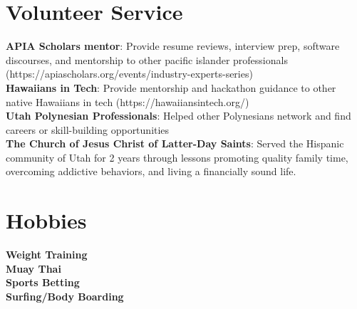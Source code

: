 \documentclass[letterpaper,11pt]{article}
\begin{document}
\section{Volunteer Service}
 \begin{itemize}[leftmargin=0.15in, label={}]
    \small{\item{
     \textbf{APIA Scholars mentor}{: Provide resume reviews, interview prep, software discourses, and mentorship to other pacific islander professionals (https://apiascholars.org/events/industry-experts-series)} \\
     \textbf{Hawaiians in Tech}{: Provide mentorship and hackathon guidance to other native Hawaiians in tech (https://hawaiiansintech.org/)} \\
     \textbf{Utah Polynesian Professionals}{: Helped other Polynesians network and find careers or skill-building opportunities} \\
     \textbf{The Church of Jesus Christ of Latter-Day Saints}{: Served the Hispanic community of Utah for 2 years through lessons promoting quality family time, overcoming addictive behaviors, and living a financially sound life.} \\
    }}
 \end{itemize}

 \section{Hobbies}
 \begin{itemize}[leftmargin=0.15in, label={}]
    \small{\item{
     \textbf{Weight Training}{} \\
     \textbf{Muay Thai}{} \\
     \textbf{Sports Betting}{} \\
     \textbf{Surfing/Body Boarding}{} \\
    }}
 \end{itemize}

\end{document}
